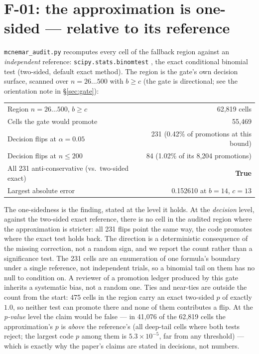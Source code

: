 \documentclass[10pt]{article}
\newcommand{\code}[1]{\texttt{#1}}
\begin{document}
\section{F-01: the approximation is one-sided --- relative to its reference}\label{sec:f01}

\code{mcnemar\_audit.py} recomputes every cell of the fallback region against
an \emph{independent} reference: \code{scipy.stats.binomtest}
\citep{scipy2020}, the exact conditional binomial test (two-sided, default
exact method). The region is the gate's own decision surface, scanned over
$n = 26\ldots500$ with $b \ge c$ (the gate is directional; see the
orientation note in \S\ref{sec:gate}):

\begin{center}
\begin{tabular}{lr}
\toprule
Region $n{=}26\ldots500$, $b\ge c$ & 62,819 cells \\
Cells the gate would promote & 55,469 \\
Decision flips at $\alpha=0.05$ & 231 \quad (0.42\% of promotions at this bound) \\
Decision flips at $n \le 200$ & 84 \quad (1.02\% of its 8,204 promotions) \\
All 231 anti-conservative (vs.\ two-sided exact) & \textbf{True} \\
Largest absolute error & 0.152610 \quad at $b{=}14$, $c{=}13$ \\
\bottomrule
\end{tabular}
\end{center}

The one-sidedness is the finding, stated at the level it holds. At the
\emph{decision} level, against the two-sided exact reference, there is no
cell in the audited region where the approximation is stricter: all 231 flips
point the same way, the code promotes where the exact test holds back. The direction is a deterministic consequence of the missing correction, not a
random sign, and we report the count rather
than a significance test. The 231 cells are an enumeration of one formula's
boundary under a single reference, not independent trials, so a binomial tail
on them has no null to condition on. A reviewer of a promotion ledger produced
by this gate inherits a systematic bias, not a random one. Ties and near-ties
are outside the count from the start: 475 cells in the region carry an exact
two-sided $p$ of exactly $1.0$, so neither test can promote there and none of
them contributes a flip. At the \emph{p-value} level the claim would be false
--- in 41{,}076 of the 62{,}819 cells the approximation's $p$ is \emph{above}
the reference's (all deep-tail cells where both tests reject; the largest
code $p$ among them is $5.3\times10^{-5}$, far from any threshold) --- which is
exactly why the paper's claims are stated in decisions, not numbers.
\end{document}
